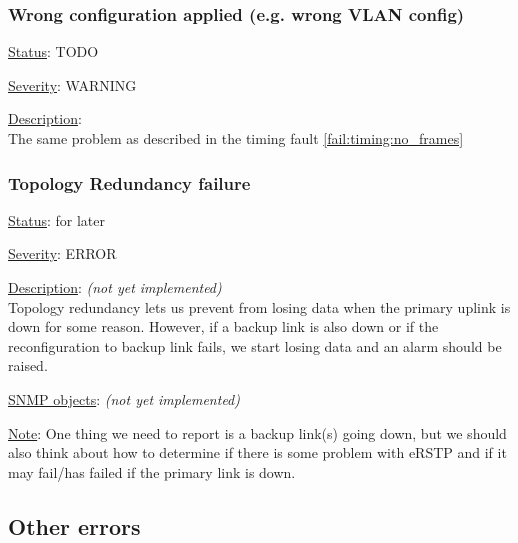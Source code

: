 \subsubsection{\bf Wrong configuration applied (e.g. wrong VLAN config)}
		\begin{pck_descr}
			\item [] \underline{Status}: TODO
			\item [] \underline{Severity}: WARNING
			\item [] \underline{Description}:\\
				The same problem as described in the timing fault
				\ref{fail:timing:no_frames}
		\end{pck_descr}

\subsubsection{\bf Topology Redundancy failure}
		\begin{pck_descr}
			\item [] \underline{Status}: for later
			\item [] \underline{Severity}: ERROR
			\item [] \underline{Description}: \emph{(not yet implemented)}\\
				Topology redundancy lets us prevent from losing data when the primary
				uplink is down for some reason. However, if a backup link is also down
				or if the reconfiguration to backup link fails, we start losing data and
        an alarm should be raised.
			\item [] \underline{SNMP objects}: \emph{(not yet implemented)}
			\item [] \underline{Note}: One thing we need to report is a backup link(s)
				going down, but we should also think about how to determine if there is
				some problem with eRSTP and if it may fail/has failed if the primary
				link is down.
		\end{pck_descr}

\newpage
\subsection{Other errors}
\label{sec:other_fail}

